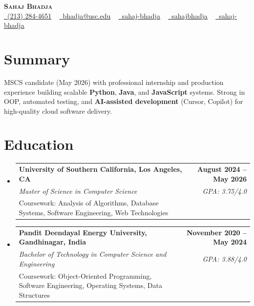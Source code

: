 \documentclass[letterpaper,10pt]{article}
\makeatletter
\newcommand{\resumeEduSubheading}[5]{\vspace{-1pt}\item\begin{tabular*}{1.0\textwidth}[t]{l@{\extracolsep{\fill}}r}\textbf{#1} & \textbf{\small #2} \\\textit{\small #3} & \textit{\small #4} \\\small #5 & \\\end{tabular*}\vspace{-4pt}}
\newcommand{\resumeSubHeadingListStart}{\begin{itemize}[leftmargin=0.0in, label={}]}
\newcommand{\resumeSubHeadingListEnd}{\end{itemize}}
\makeatother
\begin{document}
\begin{center}
{\Huge \scshape \textbf{Sahaj Bhadja}} \\ \vspace{1pt}
\small \href{tel:(213) 284-4651}{\faPhone\ \underline{(213) 284-4651}} ~ \href{mailto:bhadja@usc.edu}{\raisebox{-0.2\height}\faEnvelope\ \underline{bhadja@usc.edu}} ~
\href{https://www.linkedin.com/in/sahaj-bhadja/}{\raisebox{-0.2\height}\faLinkedin\ \underline{sahaj-bhadja}} ~ \href{https://github.com/SAHAJ-BHADJA}{\raisebox{-0.2\height}\faGithub\ \underline{sahajbhadja}} ~
\href{https://sahaj-bhadja.vercel.app/}{\raisebox{-0.2\height}\faGlobe\ \underline{sahaj-bhadja}}
\end{center}
\vspace{-18pt}
\section{Summary}
\begin{itemize}[leftmargin=0.15in, label={}]
\small{\item{MSCS candidate (May 2026) with professional internship and production experience building scalable \textbf{Python}, \textbf{Java}, and \textbf{JavaScript} systems. Strong in OOP, automated testing, and \textbf{AI-assisted development} (Cursor, Copilot) for high-quality cloud software delivery.}}
\end{itemize}
\vspace{-16pt}
\section{Education}
\resumeSubHeadingListStart
\resumeEduSubheading{University of Southern California, Los Angeles, CA}{August 2024 -- May 2026}{Master of Science in Computer Science}{GPA: 3.75/4.0}{Coursework: Analysis of Algorithms, Database Systems, Software Engineering, Web Technologies}
\vspace{-9pt}
\resumeEduSubheading{Pandit Deendayal Energy University, Gandhinagar, India}{November 2020 -- May 2024}{Bachelor of Technology in Computer Science and Engineering}{GPA: 3.88/4.0}{Coursework: Object-Oriented Programming, Software Engineering, Operating Systems, Data Structures}
\resumeSubHeadingListEnd
\vspace{-14pt}
\end{document}
